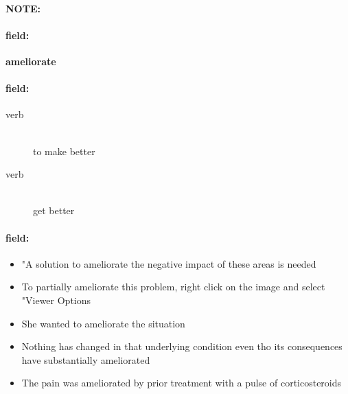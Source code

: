 \documentclass[12pt]{article}
\newenvironment{note}{\paragraph{NOTE:}}{}
\newenvironment{field}{\paragraph{field:}}{}
\begin{document}
\begin{note}
\begin{field}
\textbf{\large ameliorate}
\end{field}


\begin{field}
\begin{description}
\item[verb] \hfill \\ 
to make better

\item[verb] \hfill \\ 
get better

\end{description}
\end{field}

\begin{field}
\begin{itemize}
\item "A solution to ameliorate the negative impact of these areas is needed
\item To partially ameliorate this problem, right click on the image and select "Viewer Options
\item She wanted to ameliorate the situation
\item Nothing has changed in that underlying condition even tho its consequences have substantially ameliorated
\item The pain was ameliorated by prior treatment with a pulse of corticosteroids
\end{itemize}
\end{field}
\end{note}
\end{document}
